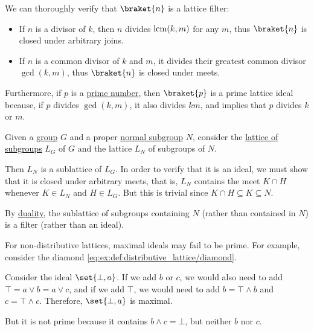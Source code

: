 \begin{example}
\begin{thmenum}
    We can thoroughly verify that \( \braket{ n } \) is a lattice filter:
    \begin{itemize}
      \item If \( n \) is a divisor of \( k \), then \( n \) divides \( \operatorname{lcm}(k, m) \) for any \( m \), thus \( \braket{ n } \) is closed under arbitrary joins.
      \item If \( n \) is a common divisor of \( k \) and \( m \), it divides their greatest common divisor \( \gcd(k, m) \), thus \( \braket{ n } \) is closed under meets.
    \end{itemize}

    Furthermore, if \( p \) is a \hyperref[def:prime_number]{prime number}, then \( \braket{ p } \) is a prime lattice ideal because, if \( p \) divides \( \gcd(k, m) \), it also divides \( km \), and  implies that \( p \) divides \( k \) or \( m \).

     Given a \hyperref[def:group]{group} \( G \) and a proper \hyperref[def:normal_subgroup]{normal subgroup} \( N \), consider the \hyperref[thm:substructures_form_complete_lattice]{lattice of subgroups} \( L_G \) of \( G \) and the lattice \( L_N \) of subgroups of \( N \).

    Then \( L_N \) is a sublattice of \( L_G \). In order to verify that it is an ideal, we must show that it is closed under arbitrary meets, that is, \( L_N \) contains the meet \( K \cap H \) whenever \( K \in L_N \) and \( H \in L_G \). But this is trivial since \( K \cap H \subseteq K \subseteq N \).

    By \hyperref[thm:lattice_duality]{duality}, the sublattice of subgroups containing \( N \) (rather than contained in \( N \)) is a filter (rather than an ideal).

     For non-distributive lattices, maximal ideals may fail to be prime. For example, consider the diamond \eqref{eq:ex:def:distributive_lattice/diamond}.

    Consider the ideal \( \set{ \bot, a } \). If we add \( b \) or \( c \), we would also need to add \( \top = a \vee b = a \vee c \), and if we add \( \top \), we would need to add \( b = \top \wedge b \) and \( c = \top \wedge c \). Therefore, \( \set{ \bot, a } \) is maximal.

    But it is not prime because it contains \( b \wedge c = \bot \), but neither \( b \) nor \( c \).
  \end{thmenum}
\end{example}

